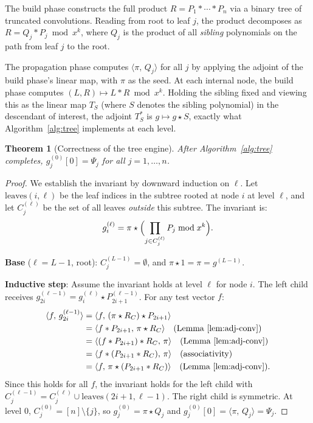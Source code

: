 \documentclass[11pt]{article}
\newtheorem{theorem}{Theorem}[section]
\newcommand{\ip}[2]{\langle #1,\, #2 \rangle}
\begin{document}
The build phase constructs the full product $R = P_1 * \cdots * P_n$ via a
binary tree of truncated convolutions. Reading from root to leaf $j$, the
product decomposes as $R = Q_j * P_j \bmod x^k$, where $Q_j$ is the product
of all \emph{sibling} polynomials on the path from leaf $j$ to the root.

The propagation phase computes $\ip{\pi}{Q_j}$ for all $j$ by
applying the adjoint of the build phase's linear map, with $\pi$ as
the seed. At each internal node, the build phase computes
$(L, R) \mapsto L * R \bmod x^k$. Holding the sibling fixed and viewing
this as the linear map $T_S$ (where $S$ denotes the sibling polynomial)
in the descendant of interest,
the adjoint $T_S^{\ast}$ is $g \mapsto g \star S$,
exactly what Algorithm~\ref{alg:tree} implements at each level.

\begin{theorem}[Correctness of the tree engine]\label{thm:tree-correct}
After Algorithm~\ref{alg:tree} completes, $g^{(0)}_j[0] = \Psi_j$ for all
$j = 1, \ldots, n$.
\end{theorem}
\begin{proof}
We establish the invariant by downward induction on $\ell$. Let
$\mathrm{leaves}(i,\ell)$ be the leaf indices in the subtree rooted at node
$i$ at level $\ell$, and let $C_j^{(\ell)}$ be the set of all leaves
\emph{outside} this subtree. The invariant is:
\begin{equation}\label{eq:invariant}
  g^{(\ell)}_i = \pi \star
    \Bigl(\prod_{j \in C_j^{(\ell)}} P_j \bmod x^k \Bigr).
\end{equation}

\textbf{Base} ($\ell = L{-}1$, root): $C_j^{(L-1)} = \emptyset$, and
$\pi \star 1 = \pi = g^{(L-1)}$.

\textbf{Inductive step}: Assume the invariant holds at level $\ell$ for
node $i$. The left child receives
$g^{(\ell-1)}_{2i} = g^{(\ell)}_i \star P^{(\ell-1)}_{2i+1}$. For any
test vector $f$:
\begin{align*}
  \ip{f}{g^{(\ell-1)}_{2i}}
  &= \ip{f}{(\pi \star R_C) \star P_{2i+1}} \\
  &= \ip{f * P_{2i+1}}{\pi \star R_C}
    \quad\text{(Lemma~\ref{lem:adj-conv})} \\
  &= \ip{(f * P_{2i+1}) * R_C}{\pi}
    \quad\text{(Lemma~\ref{lem:adj-conv})} \\
  &= \ip{f * (P_{2i+1} * R_C)}{\pi}
    \quad\text{(associativity)} \\
  &= \ip{f}{\pi \star (P_{2i+1} * R_C)}
    \quad\text{(Lemma~\ref{lem:adj-conv})}.
\end{align*}
Since this holds for all $f$, the invariant holds for the left child with
$C_j^{(\ell-1)} = C_j^{(\ell)} \cup \mathrm{leaves}(2i+1, \ell-1)$. The
right child is symmetric. At level 0, $C_j^{(0)} = [n] \setminus \{j\}$,
so $g^{(0)}_j = \pi \star Q_j$ and
$g^{(0)}_j[0] = \ip{\pi}{Q_j} = \Psi_j$.
\end{proof}
\end{document}
